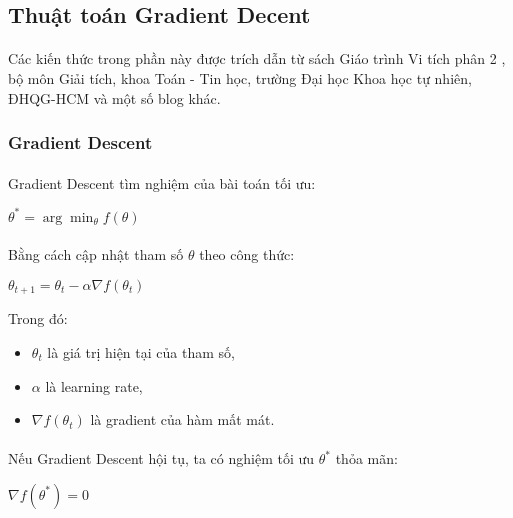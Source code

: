 \subsection{Thuật toán Gradient Decent}
\label{label:GradientDecent}
\paragraph{}{Các kiến thức trong phần này được trích dẫn từ sách Giáo trình Vi tích phân 2 \cite{vtp2}, bộ môn Giải tích, khoa Toán - Tin học, trường Đại học Khoa học tự nhiên, ĐHQG-HCM và một số blog khác.}

\subsubsection{Gradient Descent}
\paragraph{}{Gradient Descent \cite{mlcoban-gradient-descent} tìm nghiệm của bài toán tối ưu:}

\begin{center}
    \large $\theta^* = \arg\min_{\theta} f(\theta)$
\end{center}

\paragraph{}{Bằng cách cập nhật tham số $\theta$ theo công thức:}

\begin{center}
    \large $\theta_{t+1} = \theta_t - \alpha \nabla f(\theta_t)$
\end{center}

Trong đó:
\begin{itemize}
    \item $\theta_t$ là giá trị hiện tại của tham số,
    \item $\alpha$ là learning rate,
    \item $\nabla f(\theta_t)$ là gradient của hàm mất mát.
\end{itemize}

\paragraph{}{Nếu Gradient Descent hội tụ, ta có nghiệm tối ưu $\theta^*$ thỏa mãn:}

\begin{center}
    \large $\nabla f(\theta^*) = 0$
\end{center}

